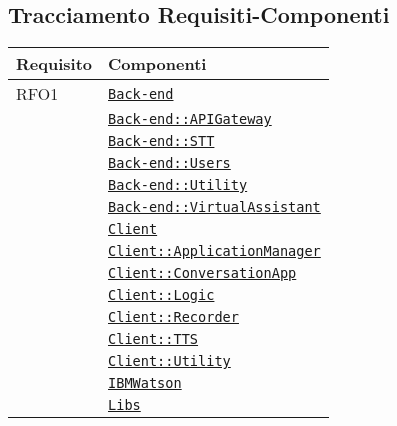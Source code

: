 \subsection{Tracciamento Requisiti-Componenti}
\normalsize
\begin{longtable}{|>{\centering}m{3cm}|m{10cm}<{\centering}|}
\hline
\textbf{Requisito} & \textbf{Componenti}\\
\hline
\endhead
RFO1 & \hyperref[Back-end]{\texttt{Back-end}}\\
& \hyperref[Back-end::APIGateway]{\texttt{Back-end::APIGateway}}\\
& \hyperref[Back-end::STT]{\texttt{Back-end::STT}}\\
& \hyperref[Back-end::Users]{\texttt{Back-end::Users}}\\
& \hyperref[Back-end::Utility]{\texttt{Back-end::Utility}}\\
& \hyperref[Back-end::VirtualAssistant]{\texttt{Back-end::VirtualAssistant}}\\
& \hyperref[Client]{\texttt{Client}}\\
& \hyperref[Client::ApplicationManager]{\texttt{Client::ApplicationManager}}\\
& \hyperref[Client::ConversationApp]{\texttt{Client::ConversationApp}}\\
& \hyperref[Client::Logic]{\texttt{Client::Logic}}\\
& \hyperref[Client::Recorder]{\texttt{Client::Recorder}}\\
& \hyperref[Client::TTS]{\texttt{Client::TTS}}\\
& \hyperref[Client::Utility]{\texttt{Client::Utility}}\\
& \hyperref[IBMWatson]{\texttt{IBMWatson}}\\
& \hyperref[Libs]{\texttt{Libs}}\\ \hline


\end{longtable}
